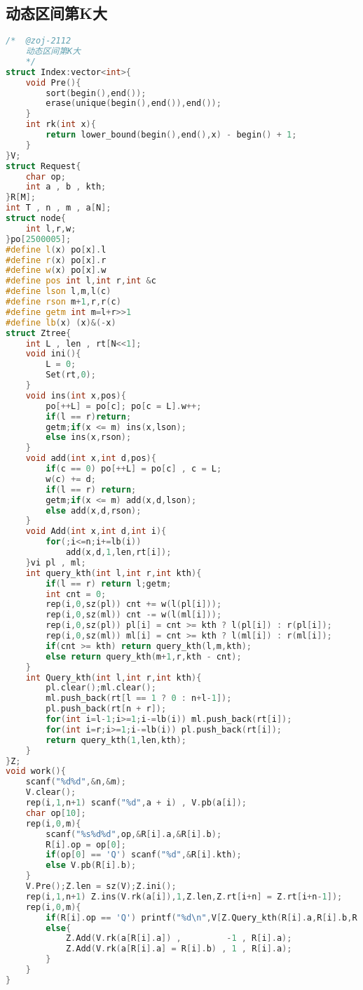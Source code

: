 \subsection{动态区间第K大}
\begin{lstlisting}[language=C++]
/*	@zoj-2112
    动态区间第K大
    */
struct Index:vector<int>{
    void Pre(){
        sort(begin(),end());
        erase(unique(begin(),end()),end());
    }
    int rk(int x){
        return lower_bound(begin(),end(),x) - begin() + 1;
    }
}V;
struct Request{
    char op;
    int a , b , kth;
}R[M];
int T , n , m , a[N];
struct node{
    int l,r,w;
}po[2500005];
#define l(x) po[x].l
#define r(x) po[x].r
#define w(x) po[x].w
#define pos int l,int r,int &c
#define lson l,m,l(c)
#define rson m+1,r,r(c)
#define getm int m=l+r>>1
#define lb(x) (x)&(-x)
struct Ztree{
    int L , len , rt[N<<1];
    void ini(){
        L = 0;
        Set(rt,0);
    }
    void ins(int x,pos){
        po[++L] = po[c]; po[c = L].w++;
        if(l == r)return;
        getm;if(x <= m) ins(x,lson);
        else ins(x,rson);
    }
    void add(int x,int d,pos){
        if(c == 0) po[++L] = po[c] , c = L;
        w(c) += d;
        if(l == r) return;
        getm;if(x <= m) add(x,d,lson);
        else add(x,d,rson);
    }
    void Add(int x,int d,int i){
        for(;i<=n;i+=lb(i))
            add(x,d,1,len,rt[i]);
    }vi pl , ml;
    int query_kth(int l,int r,int kth){
        if(l == r) return l;getm;
        int cnt = 0;
        rep(i,0,sz(pl)) cnt += w(l(pl[i]));
        rep(i,0,sz(ml)) cnt -= w(l(ml[i]));
        rep(i,0,sz(pl)) pl[i] = cnt >= kth ? l(pl[i]) : r(pl[i]);
        rep(i,0,sz(ml)) ml[i] = cnt >= kth ? l(ml[i]) : r(ml[i]);
        if(cnt >= kth) return query_kth(l,m,kth);
        else return query_kth(m+1,r,kth - cnt);
    }
    int Query_kth(int l,int r,int kth){
        pl.clear();ml.clear();
        ml.push_back(rt[l == 1 ? 0 : n+l-1]);
        pl.push_back(rt[n + r]);
        for(int i=l-1;i>=1;i-=lb(i)) ml.push_back(rt[i]);
        for(int i=r;i>=1;i-=lb(i)) pl.push_back(rt[i]);
        return query_kth(1,len,kth);
    }
}Z;
void work(){
    scanf("%d%d",&n,&m);
    V.clear();
    rep(i,1,n+1) scanf("%d",a + i) , V.pb(a[i]);
    char op[10];
    rep(i,0,m){
        scanf("%s%d%d",op,&R[i].a,&R[i].b);
        R[i].op = op[0];
        if(op[0] == 'Q') scanf("%d",&R[i].kth);
        else V.pb(R[i].b);
    }
    V.Pre();Z.len = sz(V);Z.ini();
    rep(i,1,n+1) Z.ins(V.rk(a[i]),1,Z.len,Z.rt[i+n] = Z.rt[i+n-1]);
    rep(i,0,m){
        if(R[i].op == 'Q') printf("%d\n",V[Z.Query_kth(R[i].a,R[i].b,R[i].kth) - 1]);
        else{
            Z.Add(V.rk(a[R[i].a]) ,			-1 , R[i].a);
            Z.Add(V.rk(a[R[i].a] = R[i].b) , 1 , R[i].a);
        }
    }
}
\end{lstlisting}
